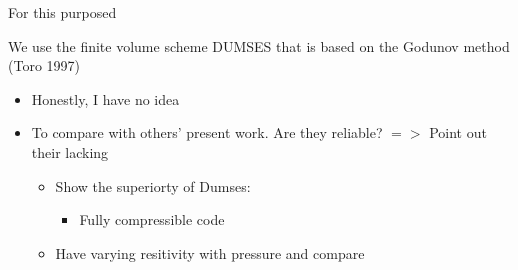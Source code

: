 \documentclass[11pt]{article}
\begin{document}
\begin{enumerate}
For this purposed 

We use the finite volume scheme DUMSES that is based on the Godunov method (Toro 1997) 


\begin{itemize}
\item Honestly, I have no idea
\item To compare with others' present work. Are they reliable? $=>$ Point out their lacking
\begin{itemize}
\item Show the superiorty of Dumses:
\begin{itemize}
\item Fully compressible code
\end{itemize}
\item Have varying resitivity with pressure and compare 
\end{itemize}
\end{itemize}

\end{enumerate}
\end{document}
